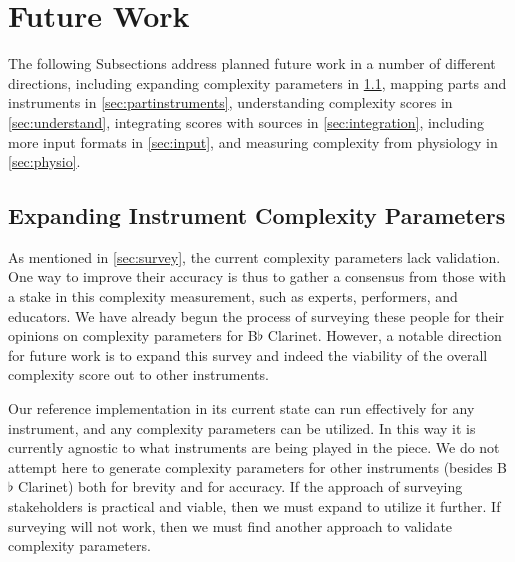 \documentclass[10pt,preprint]{sigplanconf}
\begin{document}

\section{Future Work} 
\label{sec:future}

The following Subsections address planned future work in a number of different directions, including expanding complexity parameters in \ref{sec:parameters}, mapping parts and instruments in \ref{sec:partinstruments}, understanding complexity scores in \ref{sec:understand}, integrating scores with sources in \ref{sec:integration},
including more input formats in \ref{sec:input}, and measuring complexity from physiology in \ref{sec:physio}.



\subsection{Expanding Instrument Complexity Parameters}
\label{sec:parameters}

As mentioned in \ref{sec:survey}, the current complexity parameters lack validation. One way to improve their accuracy is thus to gather a consensus from those with a stake in this complexity measurement, such as experts, performers, and educators. We have already begun the process of surveying these people for their opinions on complexity parameters for B$\flat$ Clarinet. However, a notable direction for future work is to expand this survey and indeed the viability of the overall complexity score out to other instruments.

Our reference implementation in its current state can run effectively for any instrument, and any complexity parameters can be utilized. In this way it is currently agnostic to what instruments are being played in the piece. We do not attempt here to generate complexity parameters for other instruments (besides B$\flat$ Clarinet) both for brevity and for accuracy. If the approach of surveying stakeholders is practical and viable, then we must expand to utilize it further. If surveying will not work, then we must find another approach to validate complexity parameters.
\end{document}
